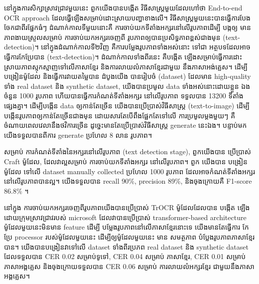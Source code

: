 \begin{adjustwidth}{0.2cm}{0.2cm}
    នៅក្នុងការសិក្សាស្រាវជ្រាវមួយនេះ ពួកយើងបានបង្កើត វិធីសាស្ដ្រមួយដែលហៅថា 
    {\englishfont\fontsize{13.5pt}{20pt}\selectfont End-to-end OCR approach}  
    ដែលធ្វើឡើងសម្រាប់ដោះស្រាយបញ្ហាខាងលើ។ វិធីសាស្ដ្រមួយនេះបានធ្វើការបែង
    ចែកជាពីរផ្នែកធំៗ ដំណាក់កាលទីមួយនោះគឺ ការចាប់យកទីតាំងអក្សរនៅលើរូបភាពដើម្បី បង្កឲ្យ
    មានភាពងាយស្រួលសម្រាប់ ការចាប់យកអក្សរចេញពី រូបភាពឲ្យបានប្រសិទ្ធភាពខ្ពស់ជាងមុន 
    {\englishfont\fontsize{13.5pt}{20pt}\selectfont (text-detection)}។ នៅក្នុងដំណាក់កាលទី២វិញ 
    គឺការបម្លែងរូបភាពទាំងអស់នោះ ទៅជា
    អត្ថបទដែលអាចធ្វើការកែប្រែបាន {\englishfont\fontsize{13.5pt}{20pt}\selectfont (text-detection)}។ 
    ដំណាក់កាលទាំងពីរនេះ គឺបង្កើត
    ឡើងសម្រាប់ធ្វើការដោះស្រាយភាពស្មុកស្មាញទៅលើភាសាខ្មែរ និងការលាយលំភាសាខ្មែរជាមួយ
    នឹងភាសាអង់គ្លេស។
    ដើម្បីបង្រៀនម៉ូដែល និងធ្វើការវាយតម្លៃបាន ដំបូងយើង បានរៀបចំ 
    {\englishfont\fontsize{13.5pt}{20pt}\selectfont (dataset)} ដែលមាន 
    {\englishfont\fontsize{13.5pt}{20pt}\selectfont high-quality} 
    ទាំង {\englishfont\fontsize{13.5pt}{20pt}\selectfont real dataset} 
    និង {\englishfont\fontsize{13.5pt}{20pt}\selectfont synthetic dataset}, យើងបានប្រមូល 
    data ទាំងអស់នោះដោយខ្លួន ឯង ចំនួន 1000 រូបភាព ហើយបានធ្វើការកំណត់ទីតាំងអក្សរ
    នៅលើរូបភាព ទទួលបាន 13200 ទីតាំងផ្សេងគ្នា។
    ដើម្បីបង្កើន data ឲ្យកាន់តែច្រើន យើងបានប្រើប្រាស់វិធីសាស្ដ្រ 
    {\englishfont\fontsize{13.5pt}{20pt}\selectfont (text-to-image)} ដើម្បី
    បង្កើនរូបភាពឲ្យកាន់តែច្រើនជាងមុន ដោយសារតែបើពឹងផ្អែកតែទៅលើ ការប្រមូលម្ដងមួយៗ
    គឺចំណាយពេលវេលានឹងថវិការច្រើន ដូច្នេះមានតែប្រើប្រាស់វិធីសាស្ដ្រ 
    {\englishfont\fontsize{13.5pt}{20pt}\selectfont generate} នេះឯង។ 
    បន្ទាប់មកយើងទទួលបានពីការ {\englishfont\fontsize{13.5pt}{20pt}\selectfont generate} 
    ប្រហែល 8 លាន រូបភាព។

    សម្រាប់ ការកំណត់ទីតាំងនៃអក្សរនៅលើរូបភាព (text detection stage), ពួកយើងបាន
    ប្រើប្រាស់ Craft ម៉ូដែល, ដែលវាល្អសម្រាប់ ការចាប់យកទីតាំងអក្សរ នៅលើរូបភាព។ ពួក
    យើងបាន បង្រៀនម៉ូដែល ទៅលើ dataset manually collected ប្រហែល 1000 
    រូបភាព ដែលអាចកំណត់ទីតាំងអក្សរនៅលើរូបភាពបានល្អ។ យើងទទួលបាន 
    {\englishfont\fontsize{13.5pt}{20pt}\selectfont recall 90\%, precision 89\%,} 
    និងចុងក្រោយគឺ {\englishfont\fontsize{13.5pt}{20pt}\selectfont F1-score 86.8\%} ។ 

    នៅក្នុង ការចាប់យកអក្សរចេញពីរូបភាពយើងបានប្រើប្រាស់ TrOCR ម៉ូដែលដែលបាន បង្កើត
    ឡើងដោយក្រុមស្រាវជ្រាវរបស់ microsoft ដែលវាបានប្រើប្រាស់ transformer-based 
    architecture ម៉ូដែលមួយនេះមិនមាន feature ដើម្បី បម្លែងរូបភាពនៅលើភាសាខ្មែរនោះទេ 
    យើងមានតែធ្វើការ កែប្រែ processor របស់ម៉ូដែលមួយនេះ ដើម្បីឲ្យម៉ូដែលមួយនេះ មាន
    សមត្ថភាព បំប្លែងរូបភាពភាសាខ្មែរបាន។ យើងបានបង្រៀនវាទៅលើ dataset ទាំងពីរប្រភព 
    real dataset និង synthetic dataset ដែលទទួលបាន CER 0.02 សម្រាប់ទូទៅ, 
    CER 0.04 សម្រាប់ ភាសាខ្មែរ,  CER 0.01 សម្រាប់ភាសាអង្គគ្លេស និងចុងក្រោយទទួលបាន 
    CER 0.06 សម្រាប់ ការលាយលំអក្សរខ្មែរ ជាមួយនឹងភាសាអង្គគ្លេស។


\end{adjustwidth}
